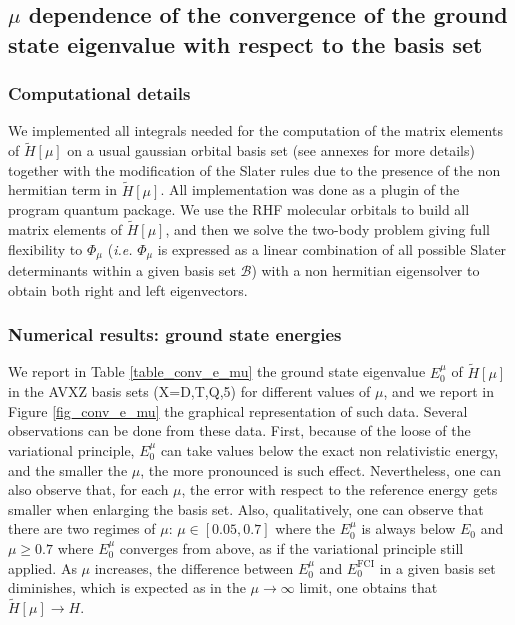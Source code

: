 \documentclass[aip,jcp,reprint,noshowkeys,superscriptaddress]{revtex4-1}
\newcommand{\basis}[0]{\mathcal{B}}
\begin{document}
\subsection{$\mu$ dependence of the convergence of the ground state eigenvalue with respect to the basis set }
\subsubsection{Computational details}
We implemented all integrals needed for the computation of the matrix elements of $\tilde{H}[\mu]$ on a usual gaussian orbital basis set (see annexes for more details) together with the modification of the Slater rules due to the presence of the non hermitian term in $\tilde{H}[\mu]$. 
All implementation was done as a plugin of the program quantum package\cite{QP2}. 
We use the RHF molecular orbitals to build all matrix elements of $\tilde{H}[\mu]$, and then we solve the two-body problem giving full flexibility to $\Phi_\mu$ (\textit{i.e.} $\Phi_\mu$ is expressed as a linear combination of all possible Slater determinants within a given basis set $\basis$) with a non hermitian eigensolver to obtain both right and left eigenvectors. 

\subsubsection{Numerical results: ground state energies}
\label{sec:total_e}
We report in Table \ref{table_conv_e_mu} the ground state eigenvalue $E_0^\mu$ of $\tilde{H}[\mu]$ in the AVXZ basis sets (X=D,T,Q,5) for different values of $\mu$, and we report in Figure \ref{fig_conv_e_mu} the graphical representation of such data. 
Several observations can be done from these data. First, because of the loose of the variational principle, $E_0^{\mu}$ can take values below the exact non relativistic energy, and the smaller the $\mu$, the more pronounced is such effect. 
Nevertheless, one can also observe that, for each $\mu$, the error with respect to the reference energy gets smaller  
when enlarging the basis set. Also, qualitatively, one can observe that there are two regimes of $\mu$: $\mu \in[0.05,0.7]$ where the $E_0^\mu$ is always below $E_0$ and $\mu\ge 0.7$ where $E_0^\mu$ converges from above, as if the variational principle still applied. 
As $\mu$ increases, the difference between $E_0^\mu$ and $E_0^\text{FCI}$ in a given basis set diminishes, 
which is expected as in the $\mu \rightarrow \infty$ limit, one obtains that  $\tilde{H}[\mu] \rightarrow H$. 
\end{document}
